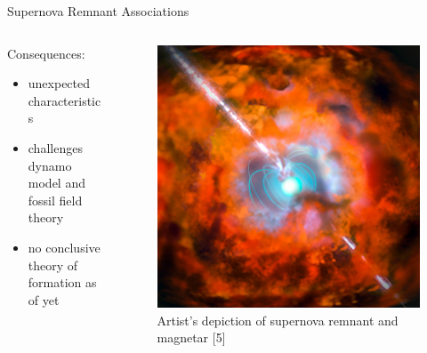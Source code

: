 \documentclass[hyperref=pdftex, presentation]{beamer}
\begin{document}
\begin{frame}{\Large Supernova Remnant Associations}
\begin{minipage}[0.2\textheight]{\textwidth}
\begin{columns}[T]
\begin{column}{0.5\textwidth}
\begin{block}{Consequences:}
					\begin{itemize}
					 \item<5-> unexpected characteristics  %
					 \item<6-> challenges dynamo model and fossil field theory
					 \item<7-> no conclusive theory of formation as of yet %
					\end{itemize}
				\end{block}
			\end{column}
			\begin{column}{0.5\textwidth}
				\begin{figure}
					\includegraphics[scale=.15]{figures/magnetar_sn_remnant.jpg}
					\caption{Artist's depiction of supernova remnant and magnetar [5]}
				\end{figure}
			\end{column}
		\end{columns}
	\end{minipage}

\end{frame}

\end{document}
